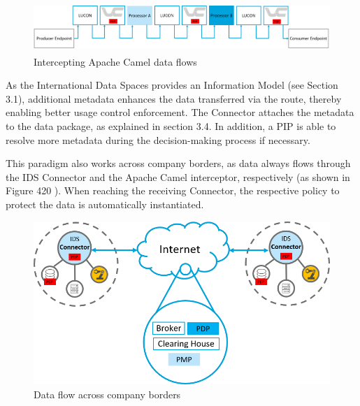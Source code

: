 
\begin{figure}[H]
	\begin{Center}
		\includegraphics[width=5.11in,height=0.74in]{./media/image75.png}
		\caption{Intercepting Apache Camel data flows}
		\label{fig:Intercepting_Apache_Camel_data_flows}
	\end{Center}
\end{figure}




As the International Data Spaces provides an Information Model (see Section 3.1),
additional metadata enhances the data transferred via the route, thereby enabling better usage control enforcement. The Connector attaches the metadata to the data package, as explained in section 3.4. In addition, a PIP is able to resolve more metadata during the decision-making process if necessary.

This paradigm also works across company borders, as data always flows through the IDS Connector and the Apache Camel interceptor, respectively (as shown in Figure 420 ). When reaching the receiving Connector, the respective policy to protect the data is automatically instantiated.



\begin{figure}[H]
	\begin{Center}
		\includegraphics{./media/image76.png} %
		\caption{Data flow across company borders}
		\label{fig:Data_flow_across_company_borders}
	\end{Center}
\end{figure}


